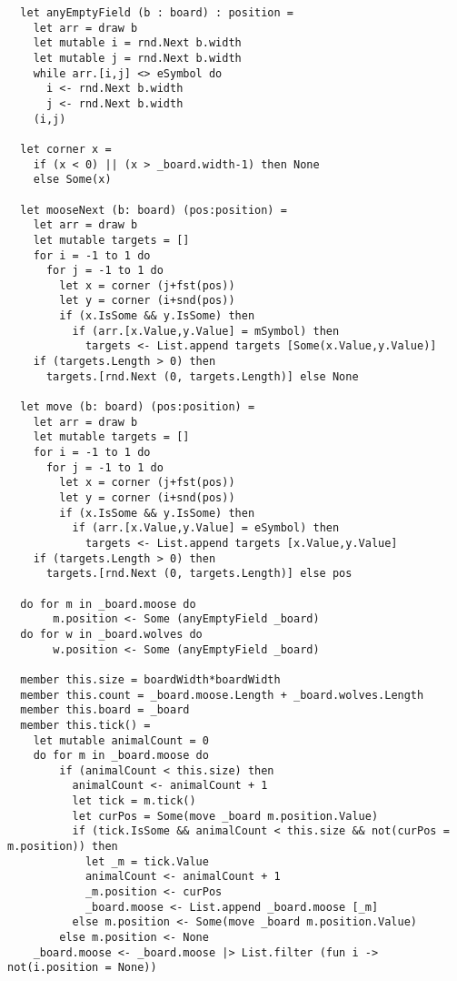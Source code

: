 \begin{lstlisting}
  let anyEmptyField (b : board) : position =
    let arr = draw b
    let mutable i = rnd.Next b.width
    let mutable j = rnd.Next b.width
    while arr.[i,j] <> eSymbol do
      i <- rnd.Next b.width
      j <- rnd.Next b.width
    (i,j)

  let corner x =
    if (x < 0) || (x > _board.width-1) then None
    else Some(x)
    
  let mooseNext (b: board) (pos:position) =
    let arr = draw b
    let mutable targets = []
    for i = -1 to 1 do
      for j = -1 to 1 do
        let x = corner (j+fst(pos))
        let y = corner (i+snd(pos))
        if (x.IsSome && y.IsSome) then
          if (arr.[x.Value,y.Value] = mSymbol) then
            targets <- List.append targets [Some(x.Value,y.Value)]
    if (targets.Length > 0) then
      targets.[rnd.Next (0, targets.Length)] else None

  let move (b: board) (pos:position) =
    let arr = draw b
    let mutable targets = []
    for i = -1 to 1 do
      for j = -1 to 1 do
        let x = corner (j+fst(pos))
        let y = corner (i+snd(pos))
        if (x.IsSome && y.IsSome) then
          if (arr.[x.Value,y.Value] = eSymbol) then
            targets <- List.append targets [x.Value,y.Value]
    if (targets.Length > 0) then
      targets.[rnd.Next (0, targets.Length)] else pos

  do for m in _board.moose do
       m.position <- Some (anyEmptyField _board)
  do for w in _board.wolves do
       w.position <- Some (anyEmptyField _board)

  member this.size = boardWidth*boardWidth
  member this.count = _board.moose.Length + _board.wolves.Length
  member this.board = _board
  member this.tick() =
    let mutable animalCount = 0
    do for m in _board.moose do
        if (animalCount < this.size) then
          animalCount <- animalCount + 1
          let tick = m.tick()
          let curPos = Some(move _board m.position.Value)
          if (tick.IsSome && animalCount < this.size && not(curPos = m.position)) then
            let _m = tick.Value
            animalCount <- animalCount + 1
            _m.position <- curPos
            _board.moose <- List.append _board.moose [_m]
          else m.position <- Some(move _board m.position.Value)
        else m.position <- None
    _board.moose <- _board.moose |> List.filter (fun i -> not(i.position = None))


\end{lstlisting}
